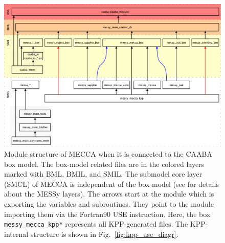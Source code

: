 \documentclass[twoside]{article}
\begin{document}
\begin{figure}
  \begin{center}
    \includegraphics[width=\textwidth]{caaba_use_diagr}
  \end{center}
  \caption{Module structure of MECCA when it is connected to the CAABA
    box model. The box-model related files are in the colored layers
    marked with BML, BMIL, and SMIL. The submodel core layer (SMCL) of
    MECCA is independent of the box model (see \citet{1664} for details
    about the MESSy layers). The arrows start at the module which is
    exporting the variables and subroutines. They point to the module
    importing them via the Fortran90 USE instruction. Here, the box {\tt
      messy\_mecca\_kpp*} represents all KPP-generated files. The
    KPP-internal structure is shown in Fig.~\ref{fig:kpp_use_diagr}.}
  \label{fig:caaba_use_diagr}
\end{figure}
\end{document}
